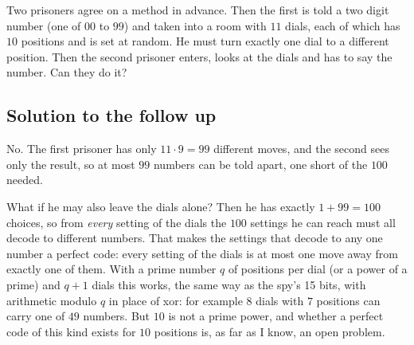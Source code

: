 Two prisoners agree on a method in advance. Then the first is told a two digit number (one of $00$ to $99$) and taken into a room
with $11$ dials, each of which has $10$ positions and is set at random. He must turn exactly one dial to a different position.
Then the second prisoner enters, looks at the dials and has to say the number. Can they do it?

\subsection{Solution to the follow up}

No. The first prisoner has only $11\cdot 9 = 99$ different moves, and the second sees only the result,
so at most $99$ numbers can be told apart, one short of the $100$ needed.

What if he may also leave the dials alone? Then he has exactly $1 + 99 = 100$ choices, so from \emph{every} setting of the dials
the $100$ settings he can reach must all decode to different numbers. That makes the settings that decode to any one number a perfect
code: every setting of the dials is at most one move away from exactly one of them. With a prime number $q$ of positions per dial
(or a power of a prime) and $q+1$ dials this works, the same way as the spy's 15 bits, with arithmetic modulo $q$ in place of xor:
for example $8$ dials with $7$ positions can carry one of $49$ numbers.
But $10$ is not a prime power, and whether a perfect code of this kind exists for $10$ positions is, as far as I know, an open problem.
